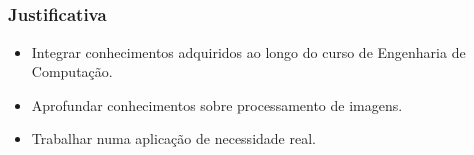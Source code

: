 \subsection{}
    \begin{frame}\frametitle{Justificativa}
        \begin{itemize}
            \item Integrar conhecimentos adquiridos ao longo do curso de Engenharia de Computação.
            \item Aprofundar conhecimentos sobre processamento de imagens.
            \item Trabalhar numa aplicação de necessidade real.
        \end{itemize}
    \end{frame} 
